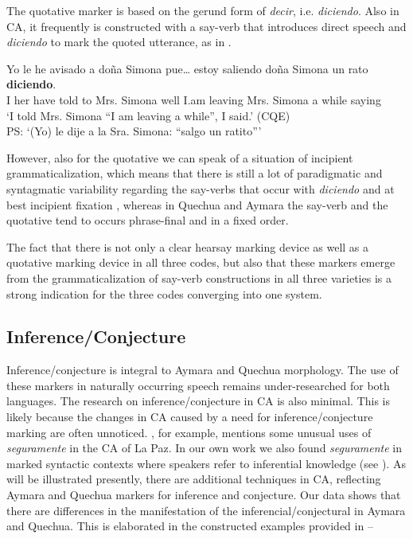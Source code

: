 \documentclass[output=paper,hidelinks]{langscibook}
\begin{document}
The quotative marker is based on the gerund form of \textit{decir}, i.e. \textit{diciendo}. Also in CA, it frequently is constructed with a say-verb that introduces direct speech and \textit{diciendo} to mark the quoted utterance, as in .

\ea \label{ex:CA-said}
\gll Yo le he avisado a doña Simona {pue\ldots} estoy saliendo doña Simona un rato \textbf{diciendo}. \\
I her have told to Mrs. Simona well I.am leaving Mrs. Simona a while saying \\ \glt ‘I told Mrs. Simona ``I am leaving a while'', I said.’ (CQE)\\
PS: `(Yo) le dije a la Sra. Simona: “salgo un ratito”'\\
\z

However, also for the quotative we can speak of a situation of incipient grammaticalization, which means that there is still a lot of paradigmatic and syntagmatic variability regarding the say-verbs that occur with \textit{diciendo} and at best incipient fixation \citep{RN30}, whereas in Quechua and Aymara the say-verb and the quotative tend to occurs phrase-final and in a fixed order. 

The fact that there is not only a clear hearsay marking device as well as a quotative marking device in all three codes, but also that these markers emerge from the grammaticalization of say-verb constructions in all three varieties is a strong indication for the three codes converging into one system. 


\subsection{Inference/Conjecture }
\label{analysis3:inferentials}
Inference/conjecture is integral to Aymara and Quechua morphology. The use of these markers in naturally occurring speech remains under-researched for both languages. The research on inference/conjecture in CA is also minimal. This is likely because the changes in CA caused by a need for inference/conjecture marking are often unnoticed. \citet{hardman1982mutual}, for example, mentions some unusual uses of \textit{seguramente} in the CA of La Paz. In our own work we also found \textit{seguramente} in marked syntactic contexts where speakers refer to inferential knowledge (see \citealt{dankel2012convergencias}). As will be illustrated presently, there are additional techniques in CA, reflecting Aymara and Quechua markers for inference and conjecture. Our data shows that there are differences in the manifestation of the inferencial/conjectural in Aymara and Quechua. This is elaborated in the constructed examples provided in -- %
\end{document}
